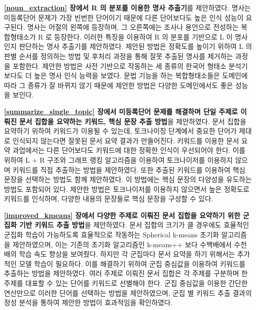 \documentclass[oneside, ko,phd]{snuthesis_utf8_kor}
\begin{document}
\textbf{\ref{noun_extraction} 장에서 R 의 분포를 이용한 명사 추출기}를 제안하였다.
명사는 미등록단어 문제가 가장 빈번한 단어이기 때문에 다른 단어보다도 높은 인식 성능이 요구된다.
명사는 어절의 왼쪽에 등장하며, 그 오른쪽에는 조사나 용언으로 전성하는 복합형태소가 R 로 등장한다.
이러한 특징을 이용하여 R 의 분포를 기반으로 L 이 명사인지 판단하는 명사 추출기를 제안하였다.
제안된 방법은 정확도를 높이기 위하여 L 의 판별 순서를 정의하는 방법 및 후처리 과정을 통해 잘못 추출된 명사를 제거하는 과정을 포함한다.
제안한 방법은 사전 기반으로 작동하는 세 종류의 한국어 형태소 분석기보다도 더 높은 명사 인식 능력을 보였다.
문법 기능을 하는 복합형태소들은 도메인에 따라 그 종류가 잘 바뀌지 않기 때문에 제안한 방법은 다양한 도메인에서도 좋은 성능을 보인다.

\textbf{\ref{summarize_single_topic} 장에서 미등록단어 문제를 해결하며 단일 주제로 이뤄진 문서 집합을 요약하는 키워드, 핵심 문장 추출 방법}을 제안하였다.
문서 집합을 요약하기 위하여 키워드가 이용될 수 있는데, 토크나이징 단계에서 중요한 단어가 제대로 인식되지 않는다면 잘못된 문서 요약 결과가 만들어진다.
키워드를 이용한 문서 요약 과업에서는 다른 단어보다도 키워드에 대한 정확한 인식이 우선되어야 한다.
이를 위하여 L + R 구조와 그래프 랭킹 알고리즘을 이용하여 토크나이저를 이용하지 않으며 키워드를 직접 추출하는 방법을 제안하였다.
또한 추출된 키워드를 이용하여 핵심 문장을 선택하는 방법도 함께 제안하였다.
이 방법에는 핵심 문장의 다양성을 유도하는 방법도 포함되어 있다.
제안한 방법은 토크나이저를 이용하지 않으면서 높은 정확도로 키워드를 인식하며, 다양한 내용의 문장들로 핵심 문장을 구성할 수 있다.

\textbf{\ref{improved_kmeans} 장에서 다양한 주제로 이뤄진 문서 집합을 요약하기 위한 군집화 기반 키워드 추출 방법}을 제안하였다.
문서 집합의 크기가 클 경우에도 효율적인 군집화 학습이 가능하도록 효율적으로 작동하는 Spherical k-means 초기화 알고리즘을 제안하였으며, 이는 기존의 초기화 알고리즘인 k-means++ 보다 수백배에서 수천배의 학습 속도 향상을 보여줬다.
하지만 각 군집마다 문서 요약을 하기 위해서는 추가적인 모델 학습이 필요하다.
이를 해결하기 위하여 군집 중심값을 이용하여 키워드를 추출하는 방법을 제안하였다.
여러 주제로 이뤄진 문서 집합은 각 주제를 구분하며 한 주제를 대표할 수 있는 단어를 키워드로 선별해야 한다.
군집 중심값을 이용한 간단한 연산만으로 이러한 단어를 선택하는 방법을 제안하였으며, 군집 별 키워드 추출 결과의 정성 분석을 통하여 제안한 방법이 효과적임을 확인하였다.
\end{document}
